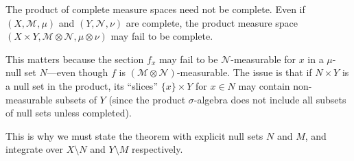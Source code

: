 \begin{remark}
    The product of complete measure spaces need not be complete. Even if $(X, \mathcal{M}, \mu)$ 
    and $(Y, \mathcal{N}, \nu)$ are complete, the product measure space $(X \times Y, \mathcal{M} \otimes \mathcal{N}, \mu \otimes \nu)$ 
    may fail to be complete. 
    
    This matters because the section $f_x$ may fail to be $\mathcal{N}$-measurable for $x$ in a 
    $\mu$-null set $N$---even though $f$ is $(\mathcal{M} \otimes \mathcal{N})$-measurable. 
    The issue is that if $N \times Y$ is a null set in the product, its ``slices'' $\{x\} \times Y$ 
    for $x \in N$ may contain non-measurable subsets of $Y$ (since the product $\sigma$-algebra 
    does not include all subsets of null sets unless completed).
    
    This is why we must state the theorem with explicit null sets $N$ and $M$, and integrate 
    over $X \setminus N$ and $Y \setminus M$ respectively.
\end{remark}

